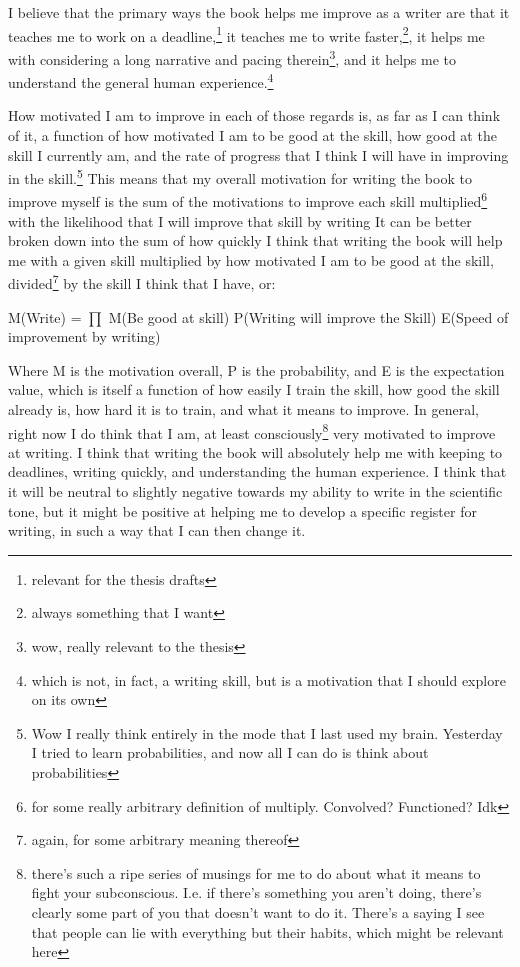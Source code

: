 \documentclass[12pt]{article}[titlepage]
\renewcommand{\,}{\textsuperscript{,}}
\begin{document}
I believe that the primary ways the book helps me improve as a writer are that it teaches me to work on a deadline,\footnote{relevant for the thesis drafts} it teaches me to write faster,\footnote{always something that I want}, it helps me with considering a long narrative and pacing therein\footnote{wow, really relevant to the thesis}, and it helps me to understand the general human experience.\footnote{which is not, in fact, a writing skill, but is a motivation that I should explore on its own}

How motivated I am to improve in each of those regards is, as far as I can think of it, a function of how motivated I am to be good at the skill, how good at the skill I currently am, and the rate of progress that I think I will have in improving in the skill.\footnote{Wow I really think entirely in the mode that I last used my brain. Yesterday I tried to learn probabilities, and now all I can do is think about probabilities}  
This means that my overall motivation for writing the book to improve myself is the sum of the motivations to improve each skill multiplied\footnote{for some really arbitrary definition of multiply. Convolved? Functioned? Idk} with the likelihood that I will improve that skill by writing  
It can be better broken down into the sum of how quickly I think that writing the book will help me with a given skill multiplied by how motivated I am to be good at the skill, divided\footnote{again, for some arbitrary meaning thereof} by the skill I think that I have, or:

M(Write) = $\prod$ M(Be good at skill) P(Writing will improve the Skill) E(Speed of improvement by writing)  

Where M is the motivation overall, P is the probability, and E is the expectation value, which is itself a function of how easily I train the skill, how good the skill already is, how hard it is to train, and what it means to improve.  
In general, right now I do think that I am, at least consciously\footnote{there's such a ripe series of musings for me to do about what it means to fight your subconscious. I.e. if there's something you aren't doing, there's clearly some part of you that doesn't want to do it. There's a saying I see that people can lie with everything but their habits, which might be relevant here} very motivated to improve at writing.  
I think that writing the book will absolutely help me with keeping to deadlines, writing quickly, and understanding the human experience.  
I think that it will be neutral to slightly negative towards my ability to write in the scientific tone, but it might be positive at helping me to develop a specific register for writing, in such a way that I can then change it.
\end{document}
